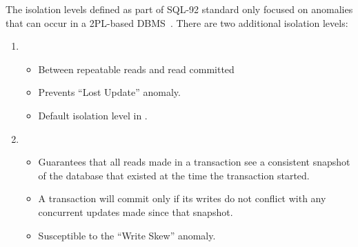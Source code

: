 \documentclass[11pt]{article}
\begin{document}
The isolation levels defined as part of SQL-92 standard only focused on anomalies that can 
occur in a 2PL-based DBMS~\cite{p1-berenson}. There are two additional isolation levels:
\begin{enumerate}
    \item {}
    \begin{itemize}
        \item Between repeatable reads and read committed
        \item Prevents ``Lost Update'' anomaly.
        \item Default isolation level in .
    \end{itemize}
    
    \item {}
    \begin{itemize}
        \item
        Guarantees that all reads made in a transaction see a consistent snapshot of the 
        database that existed at the time the transaction started.
        
        \item
        A transaction will commit only if its writes do not conflict with any concurrent 
        updates made since that snapshot.
        
        \item
        Susceptible to the ``Write Skew'' anomaly.
    \end{itemize}
\end{enumerate}

\newpage


\end{document}
